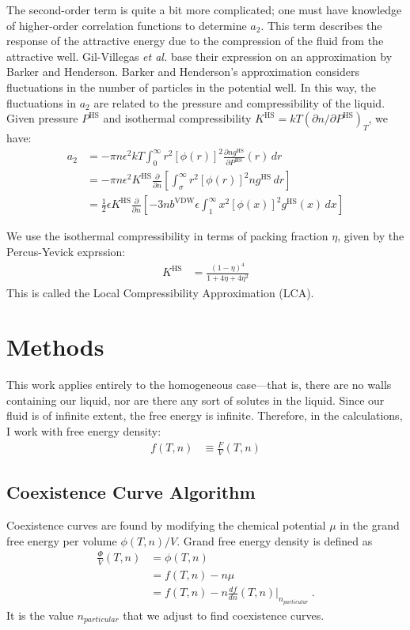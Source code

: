 \documentclass[letterpaper,twocolumn,amsmath,amssymb,prb]{revtex4-1}
\newcommand{\npart}{\ensuremath{n_{particular}}}
\newcommand{\1}{\ensuremath{\textbf{r}_1}}
\newcommand{\2}{\ensuremath{\textbf{r}_2}}
\newcommand{\3}{\ensuremath{\textbf{r}_3}}
\newcommand{\4}{\ensuremath{\textbf{r}_4}}
\begin{document}
The second-order term is quite a bit more complicated; one must have
knowledge of higher-order correlation functions to determine
$a_2$. This term describes the response of the attractive energy due
to the compression of the fluid from the attractive well. Gil-Villegas
\emph{et al.} base their expression on an approximation by Barker and
Henderson.\cite{Barker67} Barker and Henderson's approximation
considers fluctuations in the number of particles in the potential
well. In this way, the fluctuations in $a_2$ are related to the
pressure and compressibility of the liquid. Given pressure
$P^\text{HS}$ and isothermal compressibility $K^\text{HS} =
kT\left(\partial n /\partial P^\text{HS}\right)_T$, we have:
\begin{align}
  a_2 &= -\pi n \epsilon^2kT\int_0^\infty r^2\left[\phi(r)\right]^2\frac{\partial n  g^\text{HS}}{\partial P^\text{HS}}(r)\,dr \\
  &= -\pi n \epsilon^2K^\text{HS}\frac{\partial}{\partial n }\left[\int_\sigma^\infty r^2\left[\phi(r)\right]^2 n  g^\text{HS}\,dr\right] \\
  &= \frac{1}{2}\epsilon K^\text{HS}\frac{\partial}{\partial n }\left[-3 n  b^\text{VDW}\epsilon\int_1^\infty x^2\left[\phi(x)\right]^2 g^\text{HS}(x)\,dx \right]
\end{align}

We use the isothermal compressibility in terms of packing fraction
$\eta$, given by the Percus-Yevick exprssion:\cite{Barker76}
\begin{align}
  K^\text{HS} &= \frac{\left(1 - \eta\right)^4}{1 + 4\eta + 4\eta^2}
\end{align}
This is called the Local Compressibility Approximation (LCA).
\section{Methods}\label{sec:methods}

This work applies entirely to the homogeneous case---that is, there
are no walls containing our liquid, nor are there any sort of solutes
in the liquid. Since our fluid is of infinite extent, the free energy
is infinite. Therefore, in the calculations, I work with free energy density:
\begin{align}
  f(T,n) &\equiv \frac{F}{V}(T,n)
\end{align}

\subsection{Coexistence Curve Algorithm}\label{subsec:coexis}
Coexistence curves are found by modifying the chemical potential $\mu$
in the grand free energy per volume $\phi(T,n)/V$. Grand free energy
density is defined as
\begin{align}
  \frac{\Phi}{V}(T,n) &= \phi(T,n) \nonumber \\
                 &= f(T,n) - n\mu \nonumber \\
                 &= f(T,n) - n\frac{df}{dn}(T,n)\bigg|_{\npart}\ .
\end{align}
It is the value $\npart$ that we adjust to find coexistence curves.
\end{document}
